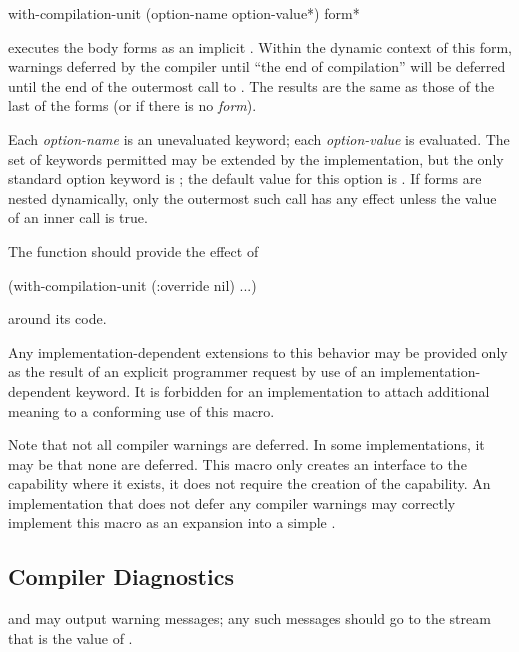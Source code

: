 \begin{defmac}
with-compilation-unit ({option-name option-value}*) {form}*

 executes the body forms as an implicit . Within the dynamic context
   of this form, warnings deferred by the compiler until ``the end of
   compilation'' will be deferred until the end of the outermost call
   to . The results are the same as those of
   the last of the forms (or  if there is no \emph{form}).

   Each \emph{option-name} is an unevaluated keyword; each \emph{option-value}
   is evaluated. The set of keywords permitted may be extended by the
   implementation, but the only standard option keyword is ;
   the default value for this option is .
   If  forms are nested dynamically, only the outermost
   such call has any effect unless the  value of an
   inner call is true.

  The function  should
  provide the effect of
  \begin{lisp}
  (with-compilation-unit (:override nil) ...)
  \end{lisp}
  around its code.

  Any implementation-dependent extensions to this behavior may be provided only
  as the result of an explicit programmer request by use of 
  an implementation-dependent keyword.  It is forbidden for an implementation
  to attach additional meaning to a conforming use of this
  macro.

  Note that not all compiler warnings are deferred. In some implementations,
  it may be that none are deferred. This macro only creates an
  interface to the capability where it exists, it does not require the
  creation of the capability. An implementation that does not 
  defer any compiler warnings may correctly implement this macro
  as an expansion into a simple .
\end{defmac}

\subsection{Compiler Diagnostics}
\label{COMPILER-DIAGNOSTICS-SECTION}

 and 
may output warning messages; any such messages should
go to the stream that is the value of .

